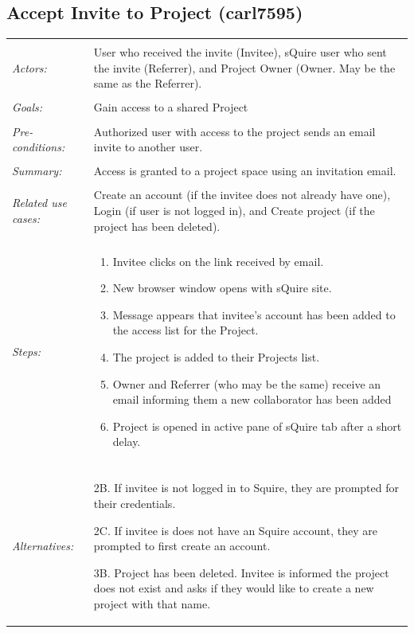 \documentclass[11pt]{report}
\begin{document}
\subsection{Accept Invite to Project (carl7595)}
\begin{tabular}{ p{2cm} p{12cm} }   
 \hline
 \\
 \textit{Actors:} & User who received the invite (Invitee), sQuire user who sent the invite (Referrer), and Project Owner (Owner. May be the same as the Referrer). \\
 \\
 \textit{Goals:} & Gain access to a shared Project \\
 \\
 \textit{Pre-conditions:} & Authorized user with access to the project sends an email invite to another user. \\
 \\
 \textit{Summary:} & Access is granted to a project space using an invitation email. \\ 
 \\
 \textit{Related use cases:} & Create an account (if the invitee does not already have one), Login (if user is not logged in), and Create project (if the project has been deleted). \\
 \\
 \textit{Steps:} & \begin{enumerate}
  \item Invitee clicks on the link received by email.
	 \item New browser window opens with sQuire site.
	 \item Message appears that invitee's account has been added to the access list for the Project.
	 \item The project is added to their Projects list.
	 \item Owner and Referrer (who may be the same) receive an email informing them a new collaborator has been added
	 \item Project is opened in active pane of sQuire tab after a short delay.
	\end{enumerate} \\
 \\
 \textit{Alternatives:} & 2B. If invitee is not logged in to Squire, they are prompted for their credentials.
 
	2C. If invitee is does not have an Squire account, they are prompted to first create an account.
	
	3B. Project has been deleted. Invitee is informed the project does not exist and asks if they would like to create a new project with that name.
	

\end{tabular}
\end{document}
